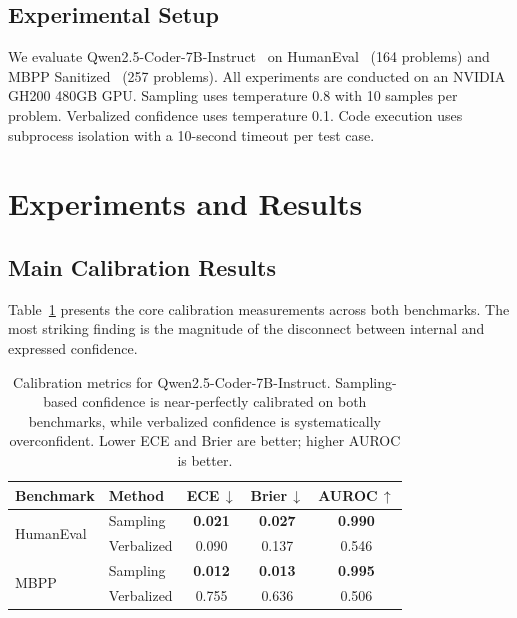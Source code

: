 \documentclass{article}
\begin{document}
\subsection{Experimental Setup}
\label{sec:setup}

We evaluate Qwen2.5-Coder-7B-Instruct~\citep{hui2024qwen25coder} on HumanEval~\citep{chen2021evaluating} (164 problems) and MBPP Sanitized~\citep{austin2021program} (257 problems). All experiments are conducted on an NVIDIA GH200 480GB GPU. Sampling uses temperature 0.8 with 10 samples per problem. Verbalized confidence uses temperature 0.1. Code execution uses subprocess isolation with a 10-second timeout per test case.

\section{Experiments and Results}
\label{sec:results}

\subsection{Main Calibration Results}

Table~\ref{tab:main} presents the core calibration measurements across both benchmarks. The most striking finding is the magnitude of the disconnect between internal and expressed confidence.

\begin{table}[t]
\centering
\caption{Calibration metrics for Qwen2.5-Coder-7B-Instruct. Sampling-based confidence is near-perfectly calibrated on both benchmarks, while verbalized confidence is systematically overconfident. Lower ECE and Brier are better; higher AUROC is better.}
\label{tab:main}
\small
\begin{tabular}{@{}llccc@{}}
\toprule
\textbf{Benchmark} & \textbf{Method} & \textbf{ECE\,$\downarrow$} & \textbf{Brier\,$\downarrow$} & \textbf{AUROC\,$\uparrow$} \\
\midrule
\multirow{2}{*}{HumanEval}
  & Sampling  & \textbf{0.021} & \textbf{0.027} & \textbf{0.990} \\
  & Verbalized & 0.090 & 0.137 & 0.546 \\
\midrule
\multirow{2}{*}{MBPP}
  & Sampling  & \textbf{0.012} & \textbf{0.013} & \textbf{0.995} \\
  & Verbalized & 0.755 & 0.636 & 0.506 \\
\bottomrule
\end{tabular}
\vspace{-0.5em}
\end{table}
\end{document}
